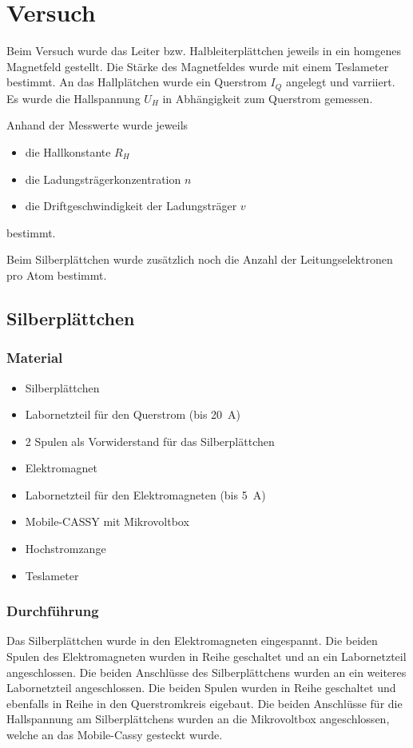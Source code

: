 \chapter{Versuch}
Beim Versuch wurde das Leiter bzw. Halbleiterplättchen jeweils in ein homgenes Magnetfeld gestellt. Die Stärke des Magnetfeldes wurde mit einem Teslameter bestimmt. An das Hallplätchen wurde ein Querstrom $I_Q$ angelegt und varriiert. Es wurde die Hallspannung $U_H$ in Abhängigkeit zum Querstrom gemessen.

Anhand der Messwerte wurde jeweils
\begin{itemize}
\item die Hallkonstante $R_H$
\item die Ladungsträgerkonzentration $n$
\item die Driftgeschwindigkeit der Ladungsträger $v$
\end{itemize}
bestimmt.

Beim Silberplättchen wurde zusätzlich noch die Anzahl der Leitungselektronen pro Atom bestimmt.

\section{Silberplättchen}

\subsection{Material}
\begin{itemize}
\item Silberplättchen
\item Labornetzteil für den Querstrom (bis \SI{20}{\ampere})
\item 2 Spulen als Vorwiderstand für das Silberplättchen
\item Elektromagnet
\item Labornetzteil für den Elektromagneten (bis \SI{5}{\ampere})
\item Mobile-CASSY mit Mikrovoltbox
\item Hochstromzange
\item Teslameter
\end{itemize}

\subsection{Durchführung}
Das Silberplättchen wurde in den Elektromagneten eingespannt.
Die beiden Spulen des Elektromagneten wurden in Reihe geschaltet und an ein Labornetzteil angeschlossen.
Die beiden Anschlüsse des Silberplättchens wurden an ein weiteres Labornetzteil angeschlossen. Die beiden Spulen wurden in Reihe geschaltet und ebenfalls in Reihe in den Querstromkreis eigebaut.
Die beiden Anschlüsse für die Hallspannung am Silberplättchens wurden an die Mikrovoltbox angeschlossen, welche an das Mobile-Cassy gesteckt wurde.

